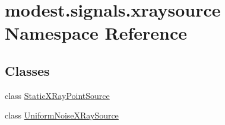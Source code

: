\hypertarget{namespacemodest_1_1signals_1_1xraysource}{}\section{modest.\+signals.\+xraysource Namespace Reference}
\label{namespacemodest_1_1signals_1_1xraysource}
\subsection*{Classes}
\begin{DoxyCompactItemize}
\item 
class \hyperlink{classmodest_1_1signals_1_1xraysource_1_1StaticXRayPointSource}{Static\+X\+Ray\+Point\+Source}
\item 
class \hyperlink{classmodest_1_1signals_1_1xraysource_1_1UniformNoiseXRaySource}{Uniform\+Noise\+X\+Ray\+Source}
\end{DoxyCompactItemize}
